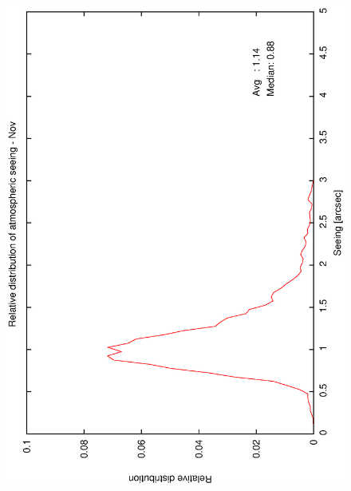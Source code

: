 {{\begin{figure}[htbp]
\begin{center}
{   \includegraphics[scale=0.25, angle=-90]{figures/ecs/corr_see_dist_nov.eps}
  }
 \subfigure[] {
   \label{fig:see_dist_dec}
}
\end{center}
\end{figure}}}

